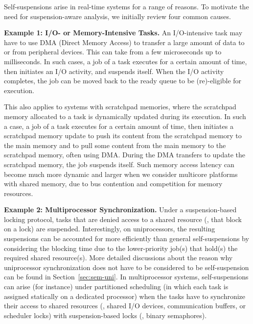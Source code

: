 \label{sec:examples}

Self-suspensions arise in real-time systems for a range of reasons. To motivate the need for suspension-aware analysis, we initially review four common causes. 


{\bf Example 1: I/O- or Memory-Intensive Tasks.}  \hspace{0.1in}
An I/O-intensive task may have to use DMA (Direct Memory Access) to transfer a large amount of data to or from peripheral devices. This can take from a few microseconds up to milliseconds. In such cases, a job of a task executes for a certain amount of time, then initiates an I/O activity, and suspends itself. When the I/O activity completes, the job can be moved back to the ready queue to be (re)-eligible for execution. 

This also applies to systems with scratchpad memories, where the scratchpad memory allocated to a task is dynamically updated during its execution. In such a case, a job of a task executes for a certain amount of time, then initiates a scratchpad memory update to push its content from the scratchpad memory to the main memory and to pull some content from the main memory to the scratchpad memory, often using DMA. During the DMA transfers to update the scratchpad memory, the job suspends itself. Such memory access latency can become much more dynamic and larger when we consider multicore platforms with shared memory, due to bus contention and competition for memory resources.

{\bf Example 2: Multiprocessor Synchronization.} \hspace{0.1in}
Under a suspension-based locking protocol, tasks that are denied access to a shared resource (\ie, that block on a lock) are suspended. Interestingly, on uniprocessors, the resulting suspensions can be accounted for more efficiently than general self-suspensions by considering the blocking time due to the lower-priority job(s) that hold(s) the required shared resource(s). More detailed discussions about the reason why uniprocessor synchronization does not have to be considered to be self-suspension can be found in Section~\ref{sec:sem-uni}. In multiprocessor systems, self-suspensions can arise (for instance) under partitioned scheduling (in which each task is assigned statically on a dedicated processor) when the tasks have to synchronize their access to shared resources (\eg, shared I/O devices, communication buffers, or scheduler locks) with suspension-based locks (\eg, binary semaphores). 

